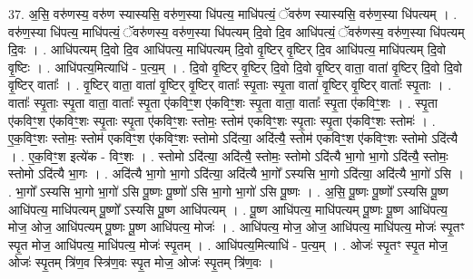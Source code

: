\documentclass[17pt]{extarticle}
\begin{document}
37. अ॒सि॒ वरु॑णस्य॒ वरु॑ण स्यास्यसि॒ वरु॑ण॒स्या धि॑पत्य॒ माधि॑पत्यं॒ ॅवरु॑ण स्यास्यसि॒ वरु॑ण॒स्या धि॑पत्यम् । . वरु॑ण॒स्या धि॑पत्य॒ माधि॑पत्यं॒ ॅवरु॑णस्य॒ वरु॑ण॒स्या धि॑पत्यम् दि॒वो दि॒व आधि॑पत्यं॒ ॅवरु॑णस्य॒ वरु॑ण॒स्या धि॑पत्यम् दि॒वः । . आधि॑पत्यम् दि॒वो दि॒व आधि॑पत्य॒ माधि॑पत्यम् दि॒वो वृ॒ष्टिर् वृ॒ष्टिर् दि॒व आधि॑पत्य॒ माधि॑पत्यम् दि॒वो वृ॒ष्टिः । . आधि॑पत्य॒मित्याधि॑ - प॒त्य॒म् । . दि॒वो वृ॒ष्टिर् वृ॒ष्टिर् दि॒वो दि॒वो वृ॒ष्टिर् वाता॒ वाता॑ वृ॒ष्टिर् दि॒वो दि॒वो वृ॒ष्टिर् वाताः᳚ । . वृ॒ष्टिर् वाता॒ वाता॑ वृ॒ष्टिर् वृ॒ष्टिर् वाताः᳚ स्पृ॒ताः स्पृ॒ता वाता॑ वृ॒ष्टिर् वृ॒ष्टिर् वाताः᳚ स्पृ॒ताः । . वाताः᳚ स्पृ॒ताः स्पृ॒ता वाता॒ वाताः᳚ स्पृ॒ता ए॑कविꣳ॒॒श ए॑कविꣳ॒॒शः स्पृ॒ता वाता॒ वाताः᳚ स्पृ॒ता ए॑कविꣳ॒॒शः । . स्पृ॒ता ए॑कविꣳ॒॒श ए॑कविꣳ॒॒शः स्पृ॒ताः स्पृ॒ता ए॑कविꣳ॒॒शः स्तोमः॒ स्तोम॑ एकविꣳ॒॒शः स्पृ॒ताः स्पृ॒ता ए॑कविꣳ॒॒शः स्तोमः॑ । . ए॒क॒विꣳ॒॒शः स्तोमः॒ स्तोम॑ एकविꣳ॒॒श ए॑कविꣳ॒॒शः स्तोमो ऽदि॑त्या॒ अदि॑त्यै॒ स्तोम॑ एकविꣳ॒॒श ए॑कविꣳ॒॒शः स्तोमो ऽदि॑त्यै । . ए॒क॒विꣳ॒॒श इत्ये॑क - विꣳ॒॒शः । . स्तोमो ऽदि॑त्या॒ अदि॑त्यै॒ स्तोमः॒ स्तोमो ऽदि॑त्यै भा॒गो भा॒गो ऽदि॑त्यै॒ स्तोमः॒ स्तोमो ऽदि॑त्यै भा॒गः । . अदि॑त्यै भा॒गो भा॒गो ऽदि॑त्या॒ अदि॑त्यै भा॒गो᳚ ऽस्यसि भा॒गो ऽदि॑त्या॒ अदि॑त्यै भा॒गो॑ ऽसि । . भा॒गो᳚ ऽस्यसि भा॒गो भा॒गो॑ ऽसि पू॒ष्णः पू॒ष्णो॑ ऽसि भा॒गो भा॒गो॑ ऽसि पू॒ष्णः । . अ॒सि॒ पू॒ष्णः पू॒ष्णो᳚ ऽस्यसि पू॒ष्ण आधि॑पत्य॒ माधि॑पत्यम् पू॒ष्णो᳚ ऽस्यसि पू॒ष्ण आधि॑पत्यम् । . पू॒ष्ण आधि॑पत्य॒ माधि॑पत्यम् पू॒ष्णः पू॒ष्ण आधि॑पत्य॒ मोज॒ ओज॒ आधि॑पत्यम् पू॒ष्णः पू॒ष्ण आधि॑पत्य॒ मोजः॑ । . आधि॑पत्य॒ मोज॒ ओज॒ आधि॑पत्य॒ माधि॑पत्य॒ मोजः॑ स्पृ॒तꣳ स्पृ॒त मोज॒ आधि॑पत्य॒ माधि॑पत्य॒ मोजः॑ स्पृ॒तम् । . आधि॑पत्य॒मित्याधि॑ - प॒त्य॒म् । . ओजः॑ स्पृ॒तꣳ स्पृ॒त मोज॒ ओजः॑ स्पृ॒तम् त्रि॑ण॒व स्त्रि॑ण॒वः स्पृ॒त मोज॒ ओजः॑ स्पृ॒तम् त्रि॑ण॒वः । \newline
\end{document}
